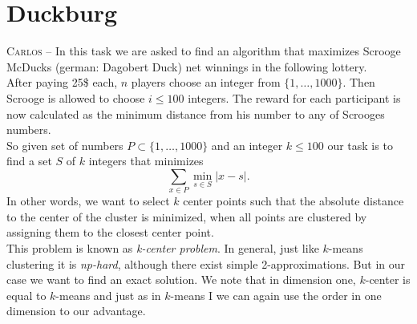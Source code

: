 \documentclass[a4paper,12pt,headsepline]{scrartcl}
\begin{document}
\section{Duckburg}\label{sec:duck}
\textsc{Carlos --}
In this task we are asked to find an algorithm that maximizes Scrooge McDucks (german: Dagobert Duck)
net winnings in the following lottery.\\
After paying 25\$ each, $n$ players choose an integer from $\{1, \dots, 1000\}$.
Then Scrooge is allowed to choose $i \leq 100$ integers. The reward
for each participant is now calculated as the minimum distance from his number to 
any of Scrooges numbers.\\
\;
So given set of numbers $P \subset \{1, \dots, 1000\}$ and an integer $k \leq 100$ our task 
is to find a set $S$ of $k$ integers that minimizes
\begin{equation}\label{eq:cluster_cost}
    \sum_{x \in P}\min_{s \in S}|x - s|.  
\end{equation}
In other words, we want to select $k$ center points such that the absolute distance to the center
of the cluster is minimized, when all points are clustered by assigning them to the closest center point.\\
This problem is known as \textit{k-center problem}. In general, just like $k$-means clustering
it is \textit{np-hard}, although there exist simple 2-approximations. But in our
case we want to find an exact solution. We note that in dimension one, $k$-center is equal 
to $k$-means and just as in $k$-means I we can again use the order in one dimension to our advantage.\\
\end{document}
